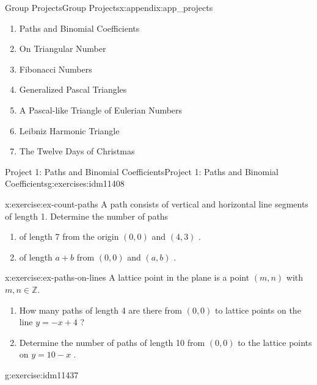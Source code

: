\documentclass[oneside,10pt,]{book}
\numberwithin{equation}{chapter}
\def\Z{\mathbb Z}
\begin{document}
\begin{appendixptx}{Group Projects}{}{Group Projects}{}{}{x:appendix:app_projects}
\begin{introduction}{}%
%
\begin{enumerate}
\item{}Paths and Binomial Coefficients%
\item{}On Triangular Number%
\item{}Fibonacci Numbers%
\item{}Generalized Pascal Triangles%
\item{}A Pascal-like Triangle of Eulerian Numbers%
\item{}Leibniz Harmonic Triangle%
\item{}The Twelve Days of Christmas%
\end{enumerate}
%
\end{introduction}%
%
%
\typeout{************************************************}
\typeout{************************************************}
%
\begin{exercises-section-numberless}{Project 1: Paths and Binomial Coefficients}{}{Project 1: Paths and Binomial Coefficients}{}{}{g:exercises:idm11408}
\begin{divisionexercise}{1}{}{}{x:exercise:ex-count-paths}%
A path consists of vertical and horizontal line segments of length 1. Determine the number of paths%
\begin{enumerate}[label=(\alph*)]
\item{}of length 7 from the origin \(\left( 0,0 \right)\) and \((4,3)\) .%
\item{}of length \(a + b\) from \(\left( 0,0 \right)\) and \((a,b)\) .%
\end{enumerate}
%
\end{divisionexercise}%
\begin{divisionexercise}{2}{}{}{x:exercise:ex-paths-on-lines}%
A lattice point in the plane is a point \((m,n)\) with \(m,n \in \Z\).%
\begin{enumerate}[label=(\alph*)]
\item{}How many paths of length 4 are there from \((0,0)\) to lattice points on the line \(y = - x + 4\) ?%
\item{}Determine the number of paths of length 10 from \((0,0)\) to the lattice points on \(y = 10 - x\) .%
\end{enumerate}
%
\end{divisionexercise}%
\begin{divisionexercise}{3}{}{}{g:exercise:idm11437}%

\end{divisionexercise}
\end{exercises-section-numberless}
\end{appendixptx}
\end{document}

